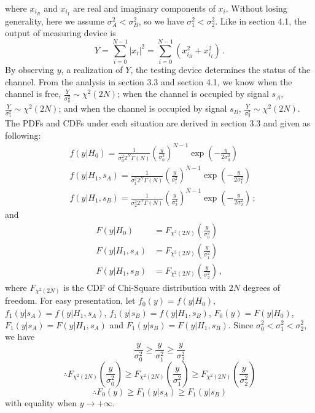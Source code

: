 where $x_{i_R}$ and $x_{i_I}$ are real and imaginary components of $x_i$. 
Without losing generality, here we assume $\sigma_A^2 < \sigma_B^2$, so we have $\sigma_1^2 < \sigma_2^2$. 
Like in section 4.1, the output of measuring device is
\begin{equation} 
  Y = \sum_{i=0}^{N-1}|x_i|^2 = \sum_{i=0}^{N-1}(x_{i_R}^2+x_{i_I}^2)\,.
  \label{equ: testing device2}
\end{equation}
By observing $y$, a realization of $Y$, the testing device determines the status of the channel. From the analysis in section 3.3 and section 4.1, we know when the channel is free, $\frac{Y}{\sigma_0^2} \sim \chi^2(2N)$; when the channel is occupied by signal $s_A$, $\frac{Y}{\sigma_1^2} \sim \chi^2(2N)$; and when the channel is occupied by signal $s_B$, $\frac{Y}{\sigma_2^2} \sim \chi^2(2N)$.  The PDFs and CDFs under each situation are derived in section 3.3 and given as following: 
\def \CHISQUY[#1]{\frac{1}{#1 2^N\Gamma(N)}\left(\frac{y}{#1}\right)^{N-1}\exp\left(-\frac{y}{2#1}\right)}
\begin{equation}
  \begin{split}
   &f(y|H_0) = \CHISQUY[\sigma_0^2]\\
  &f(y|H_1, s_A)=  \CHISQUY[\sigma_1^2]\\
  &f(y|H_1, s_B)=  \CHISQUY[\sigma_2^2]\,;
\end{split}
  \label{20150621a4}
\end{equation} 
and
\begin{equation}
  \begin{split}
    F(y|H_0) &= F_{\chi^2(2N)}(\frac{y}{\sigma_0^2})\\
    F(y|H_1, s_A) &= F_{\chi^2(2N)}(\frac{y}{\sigma_1^2})\\
    F(y|H_1, s_B) &= F_{\chi^2(2N)}(\frac{y}{\sigma_2^2})\,,
  \end{split}
\end{equation}
where $F_{\chi^2(2N)}$ is the CDF of Chi-Square distribution with $2N$ degrees of freedom. 
For easy presentation, let $f_0(y) = f(y|H_0)$, $f_1(y|s_A) = f(y|H_1, s_A)$, $f_1(y|s_B) = f(y|H_1, s_B)$, $F_0(y) = F(y|H_0)$, $F_1(y|s_A) = F(y|H_1, s_A)$ and $F_1(y|s_B) = F(y|H_1, s_B)$. 
Since $\sigma_0^2 < \sigma_1^2 < \sigma_2^2$, we have 
\begin{equation}
  \frac{y}{\sigma_0^2} \geq \frac{y}{\sigma_1^2} \geq \frac{y}{\sigma_2^2}
\end{equation}
\begin{equation}
\therefore  F_{\chi^2(2N)}(\frac{y}{\sigma_0^2}) \geq F_{\chi^2(2N)}(\frac{y}{\sigma_1^2}) \geq  F_{\chi^2(2N)}(\frac{y}{\sigma_2^2})
  \label{20150701a0}
\end{equation}
\begin{equation} 
\therefore  F_0(y) \geq F_1(y|s_A) \geq F_1(y|s_B)
  \label{20150623a1}
\end{equation}
with equality when $y \rightarrow +\infty$.

